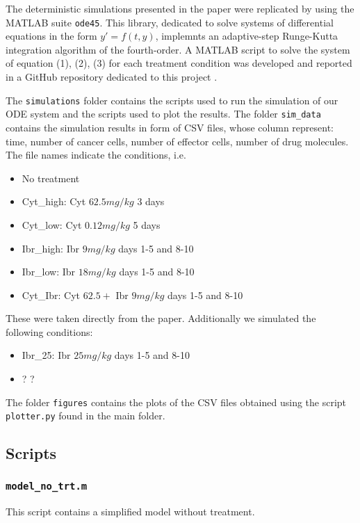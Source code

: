 The deterministic simulations presented in the paper were replicated by using the MATLAB suite \texttt{ode45}. This library, dedicated to solve systems of differential equations in the form $y'=f(t,y)$, implemnts an adaptive-step Runge-Kutta integration algorithm of the fourth-order. 
A MATLAB script to solve the system of equation (1), (2), (3) for each treatment condition was developed and reported in a GitHub repository dedicated to this project \cite{project-repo}.

The \texttt{simulations} folder contains the scripts used to run the simulation of our ODE system and the scripts used to plot the results. The folder \texttt{sim\_data} contains the simulation results in form of CSV files, whose column represent: time, number of cancer cells, number of effector cells, number of drug molecules. The file names indicate the conditions, i.e.
\begin{itemize}
	\item No treatment
	\item Cyt\_high: Cyt $62.5 mg/kg$ 3 days
	\item Cyt\_low: Cyt $0.12 mg/kg$ 5 days
	\item Ibr\_high: Ibr $9 mg/kg$ days 1-5 and 8-10
	\item Ibr\_low: Ibr $18 mg/kg$ days 1-5 and 8-10
	\item Cyt\_Ibr: Cyt $62.5 +$ Ibr $9 mg/kg$ days 1-5 and 8-10
\end{itemize}
These were taken directly from the paper. Additionally we simulated the following conditions:
\begin{itemize}
	\item Ibr\_25: Ibr $25 mg/kg$ days 1-5 and 8-10
	\item ? ?
\end{itemize}
The folder \texttt{figures} contains the plots of the CSV files obtained using the script \texttt{plotter.py} found in the main folder.\\
\subsection{Scripts}
\subsubsection{\texttt{model\_no\_trt.m}}
This script contains a simplified model without treatment.

